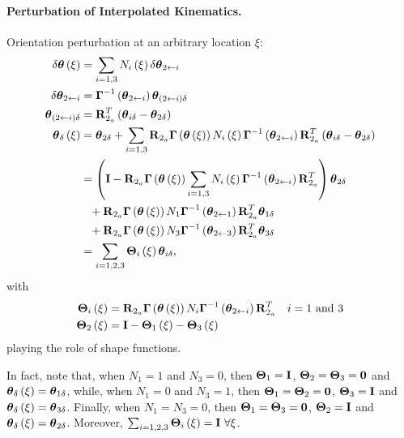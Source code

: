 \paragraph{Perturbation of Interpolated Kinematics.}
Orientation perturbation at an arbitrary location $\xi$:
\begin{align}
	\delta\bm{\mathbf{\theta}}\left( \xi \right)
	&=
	\sum_{i=1,3} N_i\left( \xi \right) \delta\bm{\mathbf{\theta}}_{2\leftarrow i}
	\\
	\delta\bm{\mathbf{\theta}}_{2\leftarrow i}
	&=
	\bm{\mathbf{\Gamma}}^{-1}\left( \bm{\mathbf{\theta}}_{2\leftarrow i} \right) \bm{\mathbf{\theta}}_{(2\leftarrow i) \delta}
	\\
	\bm{\mathbf{\theta}}_{(2\leftarrow i) \delta}
	&=
	\bm{\mathbf{R}}_{2_a}^T \left( 
		\bm{\mathbf{\theta}}_{i\delta}
		- \bm{\mathbf{\theta}}_{2\delta}
	 \right)
	\\
	\bm{\mathbf{\theta}}_{\delta}\left( \xi \right)
	&=
	\bm{\mathbf{\theta}}_{2\delta}
	+ \sum_{i=1,3} \bm{\mathbf{R}}_{2_a} \bm{\mathbf{\Gamma}}\left( \bm{\mathbf{\theta}}\left( \xi \right) \right)
		N_i\left( \xi \right) \bm{\mathbf{\Gamma}}^{-1}\left( \bm{\mathbf{\theta}}_{2\leftarrow i} \right)
		\bm{\mathbf{R}}_{2_a}^T \left( \bm{\mathbf{\theta}}_{i\delta} - \bm{\mathbf{\theta}}_{2\delta} \right)
	\nonumber \\
	&= \left( 
		\bm{\mathbf{I}}
		- \bm{\mathbf{R}}_{2_a} \bm{\mathbf{\Gamma}}\left( \bm{\mathbf{\theta}}\left( \xi \right) \right)
			\sum_{i=1,3} N_i\left( \xi \right) \bm{\mathbf{\Gamma}}^{-1}\left( \bm{\mathbf{\theta}}_{2\leftarrow i} \right)
			\bm{\mathbf{R}}_{2_a}^T
	 \right) \bm{\mathbf{\theta}}_{2\delta}
	\nonumber \\
	& \hphantom{= } \mbox{}
	+ \bm{\mathbf{R}}_{2_a} \bm{\mathbf{\Gamma}}\left( \bm{\mathbf{\theta}}\left( \xi \right) \right)
		N_1\bm{\mathbf{\Gamma}}^{-1}\left( \bm{\mathbf{\theta}}_{2\leftarrow 1} \right)
		\bm{\mathbf{R}}_{2_a}^T \bm{\mathbf{\theta}}_{1\delta}
	\nonumber \\
	& \hphantom{= } \mbox{}
	+ \bm{\mathbf{R}}_{2_a} \bm{\mathbf{\Gamma}}\left( \bm{\mathbf{\theta}}\left( \xi \right) \right)
		N_3\bm{\mathbf{\Gamma}}^{-1}\left( \bm{\mathbf{\theta}}_{2\leftarrow 3} \right)
		\bm{\mathbf{R}}_{2_a}^T \bm{\mathbf{\theta}}_{3\delta}
	\nonumber \\
	&=
	\sum_{i=1,2,3} \bm{\mathbf{\Theta}}_i\left( \xi \right) \bm{\mathbf{\theta}}_{i\delta}
	,
\end{align}
with
\begin{subequations}
\begin{align}
	\bm{\mathbf{\Theta}}_i\left( \xi \right)
	&=
	\bm{\mathbf{R}}_{2_a} \bm{\mathbf{\Gamma}}\left( \bm{\mathbf{\theta}}\left( \xi \right) \right)
		N_i\bm{\mathbf{\Gamma}}^{-1}\left( \bm{\mathbf{\theta}}_{2\leftarrow i} \right)
		\bm{\mathbf{R}}_{2_a}^T
		& i=\text{1 and 3}
	\\
	\bm{\mathbf{\Theta}}_2\left( \xi \right)
	&=
	\bm{\mathbf{I}} - \bm{\mathbf{\Theta}}_1\left( \xi \right) - \bm{\mathbf{\Theta}}_3\left( \xi \right)
\end{align}
\end{subequations}
playing the role of shape functions.

In fact, note that, when $N_1=1$ and $N_3=0$, then
$\bm{\mathbf{\Theta}}_1=\bm{\mathbf{I}}$, $\bm{\mathbf{\Theta}}_2=\bm{\mathbf{\Theta}}_3=\bm{\mathbf{0}}$
and $\bm{\mathbf{\theta}}_{\delta}\left( \xi \right)=\bm{\mathbf{\theta}}_{1\delta}$,
while, when $N_1=0$ and $N_3=1$, then
$\bm{\mathbf{\Theta}}_1=\bm{\mathbf{\Theta}}_2=\bm{\mathbf{0}}$, $\bm{\mathbf{\Theta}}_3=\bm{\mathbf{I}}$
and $\bm{\mathbf{\theta}}_{\delta}\left( \xi \right)=\bm{\mathbf{\theta}}_{3\delta}$.
Finally, when $N_1=N_3=0$, then
$\bm{\mathbf{\Theta}}_1=\bm{\mathbf{\Theta}}_3=\bm{\mathbf{0}}$, $\bm{\mathbf{\Theta}}_2=\bm{\mathbf{I}}$
and $\bm{\mathbf{\theta}}_{\delta}\left( \xi \right)=\bm{\mathbf{\theta}}_{2\delta}$.
Moreover, $\sum_{i=1,2,3}\TT{\Theta}_i\plbr{\xi}=\TT{I} \ \forall\xi$.

